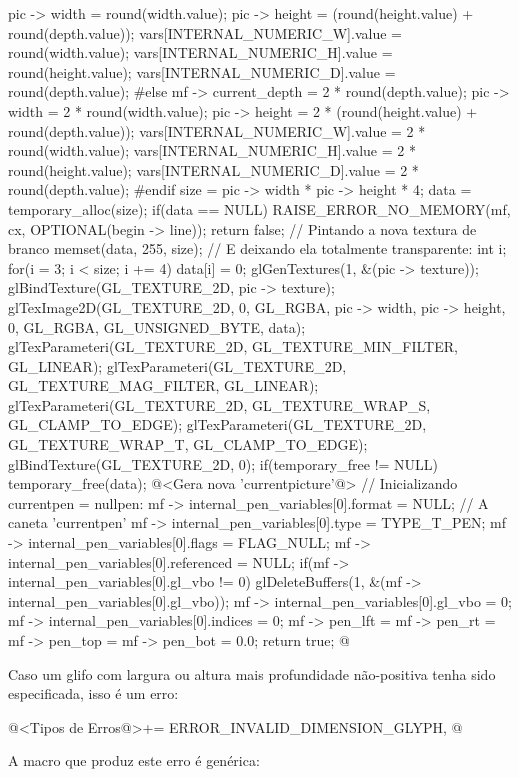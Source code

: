 {{{{{{{{    pic -> width = round(width.value);
    pic -> height = (round(height.value) + round(depth.value));
    vars[INTERNAL_NUMERIC_W].value = round(width.value);
    vars[INTERNAL_NUMERIC_H].value = round(height.value);
    vars[INTERNAL_NUMERIC_D].value = round(depth.value);
#else
    mf -> current_depth = 2 * round(depth.value);
    pic -> width = 2 * round(width.value);
    pic -> height = 2 * (round(height.value) + round(depth.value));
    vars[INTERNAL_NUMERIC_W].value = 2 * round(width.value);
    vars[INTERNAL_NUMERIC_H].value = 2 * round(height.value);
    vars[INTERNAL_NUMERIC_D].value = 2 * round(depth.value);
#endif
    size = pic -> width * pic -> height * 4;
    data = temporary_alloc(size);
    if(data == NULL){
      RAISE_ERROR_NO_MEMORY(mf, cx, OPTIONAL(begin -> line));
      return false;
    }
    // Pintando a nova textura de branco
    memset(data, 255, size);
    { // E deixando ela totalmente transparente:
      int i;
      for(i = 3; i < size; i += 4)
        data[i] = 0;
    }
    glGenTextures(1, &(pic -> texture));
    glBindTexture(GL_TEXTURE_2D, pic -> texture);
    glTexImage2D(GL_TEXTURE_2D, 0, GL_RGBA, pic -> width, pic -> height, 0,
                 GL_RGBA, GL_UNSIGNED_BYTE, data);
    glTexParameteri(GL_TEXTURE_2D, GL_TEXTURE_MIN_FILTER, GL_LINEAR);
    glTexParameteri(GL_TEXTURE_2D, GL_TEXTURE_MAG_FILTER, GL_LINEAR);
    glTexParameteri(GL_TEXTURE_2D, GL_TEXTURE_WRAP_S, GL_CLAMP_TO_EDGE);
    glTexParameteri(GL_TEXTURE_2D, GL_TEXTURE_WRAP_T, GL_CLAMP_TO_EDGE);
    glBindTexture(GL_TEXTURE_2D, 0);
    if(temporary_free != NULL)
      temporary_free(data);
    @<Gera nova 'currentpicture'@>
  }
  { // Inicializando currentpen = nullpen:
    mf -> internal_pen_variables[0].format = NULL; // A caneta 'currentpen'
    mf -> internal_pen_variables[0].type = TYPE_T_PEN;
    mf -> internal_pen_variables[0].flags = FLAG_NULL;
    mf -> internal_pen_variables[0].referenced = NULL;
    if(mf -> internal_pen_variables[0].gl_vbo != 0)
      glDeleteBuffers(1, &(mf -> internal_pen_variables[0].gl_vbo));
    mf -> internal_pen_variables[0].gl_vbo = 0;
    mf -> internal_pen_variables[0].indices = 0;
    mf -> pen_lft = mf -> pen_rt = mf -> pen_top = mf -> pen_bot = 0.0;
  }
  return true;
}
@
\fimcodigo

Caso um glifo com largura ou altura mais profundidade não-positiva
tenha sido especificada, isso é um erro:

\iniciocodigo
@<Tipos de Erros@>+=
ERROR_INVALID_DIMENSION_GLYPH,
@
\fimcodigo

A macro que produz este erro é genérica:

}}}}}}
